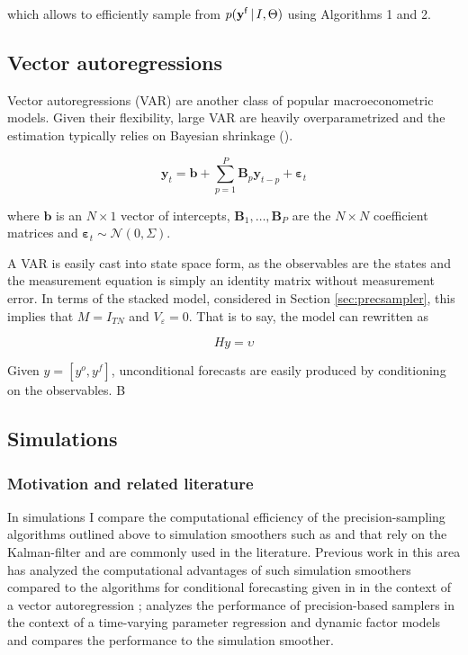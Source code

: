\documentclass[notitlepage,a4paper,12pt]{article}
\begin{document}
which allows to efficiently sample from $p(\mathbf{y}^{\sf{f}}\,|\, I, \Theta)$ using Algorithms 1 and 2. 

\subsection{Vector autoregressions}\label{sec:var}

Vector autoregressions (VAR) are another class of popular macroeconometric models. Given their flexibility, large VAR are heavily overparametrized and the estimation typically relies on Bayesian shrinkage (). 

\begin{equation}
    \mathbf{y}_t = \mathbf{b} + \sum_{p=1}^P \mathbf{B}_p \mathbf{y}_{t-p} + \boldsymbol{\varepsilon}_t
\end{equation}

where $\mathbf{b}$ is an $N \times 1$ vector of intercepts, $\mathbf{B}_1, \dots, \mathbf{B}_P$ are the $N \times N$ coefficient matrices and $\boldsymbol{\varepsilon}_t \sim \mathcal{N}(0, \Sigma)$.

A VAR is easily cast into state space form, as the observables are the states and the measurement equation is simply an identity matrix without measurement error. In terms of the stacked model, considered in Section \ref{sec:precsampler}, this implies that $M = I_{TN}$ and $V_{\varepsilon} = 0$. That is to say, the model can rewritten as

$$
H y = \upsilon
$$



Given $y=[y^o, y^f]$, unconditional forecasts are easily produced by conditioning on the observables. B

\subsection{Simulations}

\subsubsection{Motivation and related literature}

In simulations I compare the computational efficiency of the precision-sampling algorithms outlined above to  simulation smoothers such as \citet{carterkohn1994_biomtr} and \citet{durbinkoopman2002_biomtr} that rely on the Kalman-filter and are commonly used in the literature. Previous work in this area has analyzed the computational advantages of such simulation smoothers compared to the algorithms for conditional forecasting given in \citet{waggonerzha1999_res} in the context of a vector autoregression \citep{bgl_2015ijf}; \citet{mmp2011_csda} analyzes the performance of precision-based samplers in the context of a time-varying parameter regression and dynamic factor models and compares the performance to the \citet{durbinkoopman2002_biomtr} simulation smoother.\\
\end{document}
